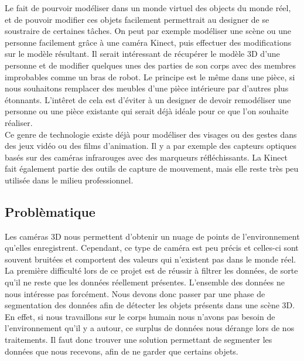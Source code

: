 Le fait de pourvoir modéliser dans un monde virtuel des objects du monde réel, et de pouvoir modifier ces 
objets facilement permettrait au designer de se soustraire de certaines tâches. On peut par exemple modéliser
une scène ou une personne facilement grâce à une caméra Kinect, puis effectuer des modifications sur le modèle résultant. Il serait
intéressant de récupérer le modèle 3D d'une personne et de modifier quelques unes des parties de son corps avec
des membres improbables comme un bras de robot. Le principe est le même dans une pièce, si nous souhaitons remplacer
des meubles d'une pièce intérieure par d'autres plus étonnants. L'intêret de cela est d'éviter à un designer de 
devoir remodéliser une personne ou une pièce existante qui serait déjà idéale pour ce que l'on souhaite réaliser.\\

Ce genre de technologie existe déjà pour modéliser des visages ou des gestes dans des jeux vidéo ou des films d'animation. 
Il y a par exemple des capteurs optiques basés sur des caméras infrarouges avec des marqueurs réfléchissants. La Kinect fait
également partie des outils de capture de mouvement, mais elle reste très peu utilisée dans le milieu professionnel.

\subsection{Problèmatique}
Les caméras 3D nous permettent d'obtenir un nuage de points de l'environnement qu'elles enregistrent. Cependant, ce 
type de caméra est peu précis et celles-ci sont souvent bruitées et comportent des valeurs qui n'existent pas dans le monde 
réel. 
La première difficulté lors de ce projet est de réussir à filtrer les données, de sorte qu'il ne reste que les données réellement présentes.
L'ensemble des données ne nous intéresse pas forcément. Nous devons donc passer par une phase de segmentation des données
afin de détecter les objets présents dans une scène 3D.
En effet, si nous travaillons sur le corps humain nous n'avons
pas besoin de l'environnement qu'il y a autour, ce surplus de données nous dérange lors de nos traitements. Il faut
donc trouver une solution permettant de segmenter les données que nous recevons, afin de ne garder que certains objets.\\ 
 
